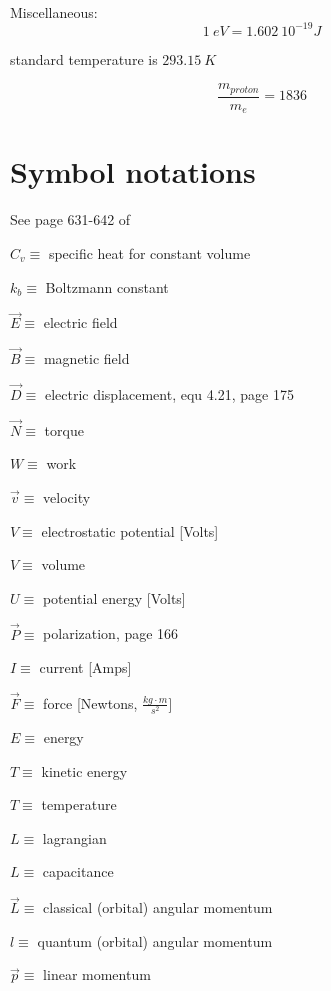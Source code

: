 \documentclass[12pt]{article}  %
\begin{document}
\ \\
Miscellaneous: 
\begin{equation}
 1 \ eV = 1.602 \ 10^{-19} J
\end{equation}

standard temperature is $293.15 \ K$

\begin{equation}
 \frac{m_{proton}}{m_e} = 1836
\end{equation}


\section{Symbol notations}

See page 631-642 of \cite{ReifThermo}

$C_v \equiv$ specific heat for constant volume

$k_b \equiv$ Boltzmann constant

$\vec{E} \equiv$ electric field

$\vec{B} \equiv$ magnetic field

$\vec{D} \equiv$ electric displacement, equ 4.21, page 175 \cite{GriffithED}

$\vec{N} \equiv$ torque

$W \equiv$ work

$\vec{v} \equiv$ velocity

$V \equiv$ electrostatic potential [Volts]

$V \equiv$ volume

$U \equiv$ potential energy [Volts]

$\vec{P} \equiv$ polarization, page 166 \cite{GriffithED}

$I \equiv$ current [Amps]

$\vec{F} \equiv$ force [Newtons, $\frac{kg \cdot m}{s^2}$]

$E \equiv$ energy

$T \equiv$ kinetic energy

$T \equiv$ temperature

$L \equiv$ lagrangian

$L \equiv$ capacitance

$\vec{L} \equiv$ classical (orbital) angular momentum

$l \equiv$ quantum (orbital) angular momentum

$\vec{p} \equiv$ linear momentum
\end{document}
